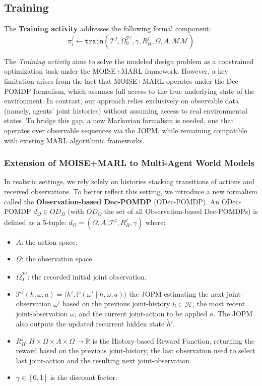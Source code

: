 \documentclass[pdflatex,sn-mathphys-num]{sn-jnl}%
\theoremstyle{thmstyleone}%
\theoremstyle{thmstyletwo}%
\theoremstyle{thmstylethree}%
\begin{document}
\subsection{Training}\label{sec:training}

The \textbf{Training activity} addresses the following formal component:
%
\begin{displaymath}
    \pi^j_i \gets \texttt{train}(\mathcal{T}^j, \Omega^{\mathcal{T}^j}_0, \gamma, R^j_H, \Omega, A, \mathcal{MM})
\end{displaymath}

The \textit{Training activity} aims to solve the modeled design problem as a constrained optimization task under the MOISE+MARL framework. However, a key limitation arises from the fact that MOISE+MARL operates under the Dec-POMDP formalism, which assumes full access to the true underlying state of the environment. In contrast, our approach relies exclusively on observable data (namely, agents' joint histories) without assuming access to real environmental states. To bridge this gap, a new Markovian formalism is needed, one that operates over observable sequences via the JOPM, while remaining compatible with existing MARL algorithmic frameworks.


\subsubsection{Extension of MOISE+MARL to Multi-Agent World Models}

\noindent In realistic settings, we rely solely on histories stacking transitions of actions and received observations. To better reflect this setting, we introduce a new formalism called the \textbf{Observation-based Dec-POMDP} (ODec-POMDP).
%
An ODec-POMDP $d_\Omega \in OD_\Omega$ (with $OD_\Omega$ the set of all Observation-based Dec-POMDPs) is defined as a 5-tuple:
%
$d_\Omega = \left(\Omega, A, \mathcal{T}^j, R^j_H, \gamma \right)$
%
where:
\begin{itemize}
    \item $A$: the action space.
    \item $\Omega$: the observation space.
    \item $\Omega^{\mathcal{T}^j}_0$: the recorded initial joint observation.
    \item $\mathcal{T}^j(h, \omega, a) = \langle {\tilde{h}}', \mathbb{P}(\omega' \mid h, \omega, a) \rangle$ the JOPM estimating the next joint-observation $\omega'$ based on the previous joint-history $\tilde{h} \in \mathcal{H}$, the most recent joint-observation $\omega$, and the current joint-action to be applied $a$. The JOPM also outputs the updated recurrent hidden state $\tilde{h}'$.
    \item $R^j_H: H \times \Omega \times A \times \Omega \rightarrow \mathbb{R}$ is the History-based Reward Function, returning the reward based on the previous joint-history, the last observation used to select last joint-action and the resulting next joint-observation.
    \item $\gamma \in [0, 1]$ is the discount factor.
\end{itemize}
\end{document}
